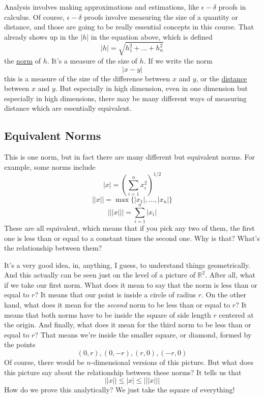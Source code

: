 \documentclass{article}
\newcommand{\reals}[0]{\mathbb{R}}
\begin{document}
Analysis involves making approximations and estimations, like \(\epsilon-\delta\) proofs in calculus. Of course, \(\epsilon-\delta\) proofs involve measuring the size of a quantity or distance, and those are going to be really essential concepts in this course. That already shows up in the \(|h|\) in the equation above, which is defined
\begin{equation}|h| = \sqrt{h_1^2 + ... + h_n^2}\end{equation}
the \underline{norm} of \(h\). It's a measure of the size of \(h\). If we write the norm
\begin{equation}|x - y|\end{equation}
this is a measure of the size of the difference between \(x\) and \(y\), or the \underline{distance} between \(x\) and \(y\). But especially in high dimension, even in one dimension but especially in high dimensions, there may be many different ways of measuring distance which are essentially equivalent.

\subsection{Equivalent Norms}
This is one norm, but in fact there are many different but equivalent norms. For example, some norms include
\begin{equation}|x| = \left(\sum_{i = 1}^nx_i^2\right)^{1/2}\end{equation}
\begin{equation}||x|| = \max\{|x_1|,...,|x_n|\}\end{equation}
\begin{equation}|||x||| = \sum_{i = 1}^n|x_i|\end{equation}
These are all equivalent, which means that if you pick any two of them, the first one is less than or equal to a constant times the second one. Why is that? What's the relationship between them?

It's a very good idea, in, anything, I guess, to understand things geometrically. And this actually can be seen just on the level of a picture of \(\reals^2\). After all, what if we take our first norm. What does it mean to say that the norm is less than or equal to \(r\)? It means that our point is inside a circle of radius \(r\). On the other hand, what does it mean for the \textit{second} norm to be less than or equal to \(r\)? It means that both norms have to be inside the square of side length \(r\) centered at the origin. And finally, what does it mean for the third norm to be less than or equal to \(r\)? That means we're inside the smaller square, or diamond, formed by the points
\begin{equation}(0, r), (0, -r), (r, 0), (-r, 0)\end{equation}
Of course, there would be \(n\)-dimensional versions of this picture. But what does this picture say about the relationship between these norms? It tells us that
\begin{equation}||x|| \leq |x| \leq |||x|||\end{equation}
How do we prove this analytically? We just take the square of everything!
\end{document}
